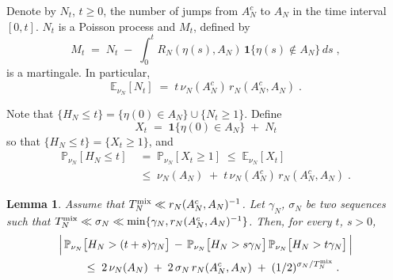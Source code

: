 \documentclass[reqno]{amsart}
\newtheorem{lemma}[theorem]{Lemma}
\begin{document}
Denote by $N_t$, $t\ge 0$, the number of jumps from $A_N^c$ to
$A_N$ in the time interval $[0,t]$. $N_t$ is a Poisson process and
$M_t$, defined by
\begin{equation*}
M_t\;=\; N_t \;-\; \int_0^t R_N(\eta(s), A_N) \, {{\mathbf 1}}\{\eta(s)
\not\in A_N\} \, ds\;,
\end{equation*}
is a martingale. In particular,
\begin{equation*}
{{\mathbb E}}_{\nu_N} [N_t] \;=\; t \, \nu_N
(A_N^c)\, r_N(A_N^c, A_N) \;.
\end{equation*}

Note that $\{H_N\le t\} = \{\eta(0)\in A_N\} \cup \{N_t \ge 1\}$.
Define
\begin{equation*}
X_t \;=\; {{\mathbf 1}} \{\eta(0)\in A_N\} \;+\; N_t
\end{equation*}
so that $\{H_N\le t\} = \{X_t \ge 1\}$, and 
\begin{equation}
\label{01}
\begin{split}
{{\mathbb P}}_{\nu_N} [H_N \le t] \; &=\;
{{\mathbb P}}_{\nu_N} [X_t \ge 1] \;\le\;
{{\mathbb E}}_{\nu_N} [X_t]  \\
& \le\; \nu_N (A_N) \;+\; t\, \nu_N
(A_N^c)\, r_N(A_N^c, A_N)\;.
\end{split}
\end{equation} 

\begin{lemma}
\label{s01}
Assume that $T^{\rm mix}_N \ll r_N(A_N^c, A_N)^{-1}$. Let $\gamma_N$,
$\sigma_N$ be two sequences such that $T^{\rm mix}_N \ll \sigma_N \ll
\min\{\gamma_N, r_N(A_N^c, A_N)^{-1}\}$. Then, for every $t$, $s> 0$,
\begin{equation*}
\begin{split}
& \Big|\, {{\mathbb P}}_{\nu_N} \big[H_N> (t+s) \gamma_N \big] \,-\, 
{{\mathbb P}}_{\nu_N} \big[H_N> s \gamma_N \big] \, 
{{\mathbb P}}_{\nu_N} \big[H_N> t \gamma_N \big] \, \Big| \\
&\qquad \;\le\; 2\, \nu_N (A_N) \;+\; 
2\, \sigma_N \, r_N(A_N^c, A_N) \;+\;
(1/2)^{\sigma_N/T^{\rm mix}_N}\;.
\end{split}
\end{equation*}
\end{lemma}
\end{document}
